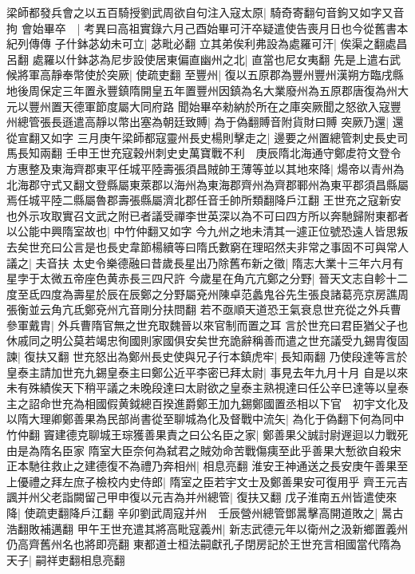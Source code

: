 梁師都發兵會之以五百騎授劉武周欲自句注入寇太原|{
	騎奇寄翻句音鉤又如字又音拘}
會始畢卒　|{
	考異曰高祖實錄六月己酉始畢可汗卒疑遣使告喪月日也今從舊書本紀列傳傳}
子什鉢苾幼未可立|{
	苾毗必翻}
立其弟俟利弗設為處羅可汗|{
	俟渠之翻處昌呂翻}
處羅以什鉢苾為尼步設使居東偏直幽州之北|{
	直當也尼女夷翻}
先是上遣右武候將軍高靜奉幣使於突厥|{
	使疏吏翻}
至豐州|{
	復以五原郡為豐州豐州漢朔方臨戌縣地後周保定三年置永豐鎮隋開皇五年置豐州因鎮為名大業廢州為五原郡唐復為州大元以豐州置天德軍節度屬大同府路}
聞始畢卒勑納於所在之庫突厥聞之怒欲入寇豐州總管張長遜遣高靜以幣出塞為朝廷致賻|{
	為于偽翻賻音附貨財曰賻}
突厥乃還|{
	還從宣翻又如字}
三月庚午梁師都寇靈州長史楊則擊走之|{
	邊要之州置總管刺史長史司馬長知兩翻}
壬申王世充寇穀州刺史史萬寶戰不利　庚辰隋北海通守鄭䖍符文登令方惠整及東海齊郡東平任城平陸壽張須昌賊帥王薄等並以其地來降|{
	煬帝以青州為北海郡守式又翻文登縣屬東萊郡以海州為東海郡齊州為齊郡鄆州為東平郡須昌縣屬焉任城平陸二縣屬魯郡壽張縣屬濟北郡任音壬帥所類翻降戶江翻}
王世充之寇新安也外示攻取實召文武之附已者議受禪李世英深以為不可曰四方所以奔馳歸附東都者以公能中興隋室故也|{
	中竹仲翻又如字}
今九州之地未清其一遽正位號恐遠人皆思叛去矣世充曰公言是也長史韋節楊續等曰隋氏數窮在理昭然夫非常之事固不可與常人議之|{
	夫音扶}
太史令樂德融曰昔歲長星出乃除舊布新之徵|{
	隋志大業十三年六月有星孛于太微五帝座色黄赤長三四尺許}
今歲星在角亢亢鄭之分野|{
	晉天文志自軫十二度至氐四度為壽星於辰在辰鄭之分野屬兗州陳卓范蠡鬼谷先生張良諸葛亮京房譙周張衡並云角亢氐鄭兗州亢音剛分扶問翻}
若不亟順天道恐王氣衰息世充從之外兵曹參軍戴胄|{
	外兵曹隋官無之世充取魏晉以來官制而置之耳}
言於世充曰君臣猶父子也休戚同之明公莫若竭忠徇國則家國俱安矣世充詭辭稱善而遣之世充議受九錫胄復固諫|{
	復扶又翻}
世充怒出為鄭州長史使與兄子行本鎮虎牢|{
	長知兩翻}
乃使段達等言於皇泰主請加世充九錫皇泰主曰鄭公近平李密已拜太尉|{
	事見去年九月十月}
自是以來未有殊績俟天下稍平議之未晚段達曰太尉欲之皇泰主熟視達曰任公辛巳達等以皇泰主之詔命世充為相國假黄鉞總百揆進爵鄭王加九錫鄭國置丞相以下官　初宇文化及以隋大理卿鄭善果為民部尚書從至聊城為化及督戰中流矢|{
	為化于偽翻下何為同中竹仲翻}
竇建德克聊城王琮獲善果責之曰公名臣之家|{
	鄭善果父誠討尉遟迴以力戰死由是為隋名臣家}
隋室大臣奈何為弑君之賊効命苦戰傷痍至此乎善果大慙欲自殺宋正本馳往救止之建德復不為禮乃奔相州|{
	相息亮翻}
淮安王神通送之長安庚午善果至上優禮之拜左庶子檢校内史侍郎|{
	隋室之臣若宇文士及鄭善果安可復用乎}
齊王元吉諷并州父老詣闕留己甲申復以元吉為并州總管|{
	復扶又翻}
戊子淮南五州皆遣使來降|{
	使疏吏翻降戶江翻}
辛卯劉武周寇并州　壬辰營州總管鄧暠擊高開道敗之|{
	暠古浩翻敗補邁翻}
甲午王世充遣其將高毗寇義州|{
	新志武德元年以衛州之汲新鄉置義州仍高齊舊州名也將即亮翻}
東都道士桓法嗣獻孔子閉房記於王世充言相國當代隋為天子|{
	嗣祥吏翻相息亮翻}
